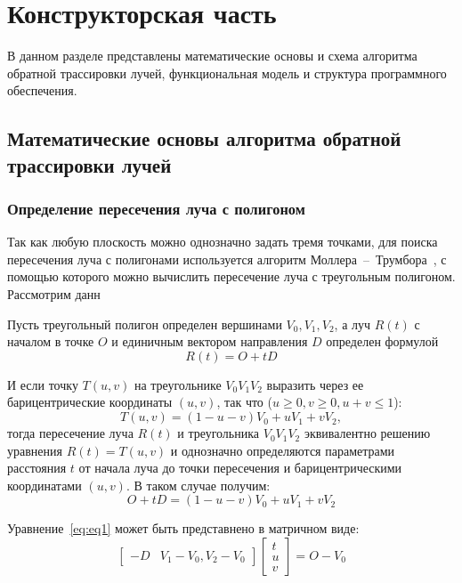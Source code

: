 \chapter{Конструкторская часть}

В данном разделе представлены математические основы и схема алгоритма обратной трассировки лучей, функциональная модель и структура программного обеспечения. 


\section{Математические основы алгоритма обратной трассировки лучей}
\subsection{Определение пересечения луча с полигоном}
Так как любую плоскость можно однозначно задать тремя точками, для поиска пересечения луча с полигонами используется алгоритм Моллера~--~Трумбора~\cite{trIntersect}, с помощью которого можно вычислить пересечение луча с треугольным полигоном. Рассмотрим данн

Пусть треугольный полигон определен вершинами $V_0, V_1, V_2$, а луч $R(t)$ с началом в точке $O$ и единичным  вектором направления $D$ определен формулой
\begin{equation}
	R(t) = O + tD
\end{equation}

И если точку $T(u,v)$ на треугольнике $V_0V_1V_2$ выразить через ее барицентрические координаты $(u,v)$, так что ($u \geq 0, v \geq 0, u + v \leq 1$):
\begin{equation}
	T(u,v) = (1 - u - v)V_0 + uV_1 + vV_2,
\end{equation}
тогда пересечение луча $R(t)$ и треугольника $V_0V_1V_2$ эквивалентно решению уравнения
$R(t) = T(u, v)$ и однозначно определяются параметрами расстояния $t$ от начала луча до точки пересечения и барицентрическими координатами $(u,v)$. В таком случае получим:
\begin{equation}\label{eq:eq1}
	O + tD = (1- u - v)V_0 + uV_1 + vV_2
\end{equation}

Уравнение~\ref{eq:eq1} может быть представнено в матричном виде:
\begin{equation}
	\label{slau}
	\begin{bmatrix}
		-D & V_1 - V_0, V_2 - V_0
	\end{bmatrix}
	\begin{bmatrix}
		t\\
		u\\
		v
	\end{bmatrix} = O - V_0 
\end{equation}

